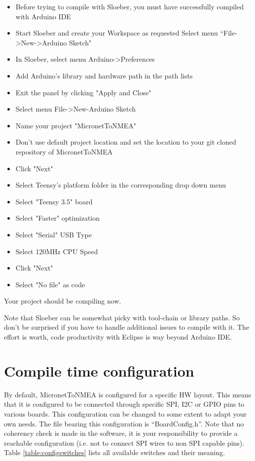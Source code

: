 \documentclass{report}
\begin{document}
\begin{itemize}
\item Before trying to compile with Sloeber, you must have successfully compiled with Arduino IDE
\item Start Sloeber and create your Workspace as requested Select menu “File->New->Arduino Sketch"
\item In Sloeber, select menu Arduino->Preferences
\item Add Arduino's library and hardware path in the path lists
\item Exit the panel by clicking "Apply and Close"
\item Select menu File->New-Arduino Sketch
\item Name your project "MicronetToNMEA"
\item Don't use default project location and set the location to your git cloned repository of MicronetToNMEA
\item Click "Next"
\item Select Teensy's platform folder
in the corresponding drop down menu
\item Select "Teensy 3.5" board
\item Select "Faster" optimization
\item Select "Serial" USB Type
\item Select 120MHz CPU Speed
\item Click "Next"
\item Select "No file" as code
\end{itemize}

Your project should be compiling now.

Note that Sloeber can be somewhat picky with tool-chain or library paths. So don’t be surprised if you have to handle additional issues to compile with it. The effort is worth, code productivity with Eclipse is way beyond Arduino IDE.

\section{Compile time configuration}

By default, MicronetToNMEA is configured for a specific HW layout. This means that it is configured to be connected through specific SPI, I2C or GPIO pins to various boards. This configuration can be changed to some extent to adapt your own needs. The file bearing this configuration is “BoardConfig.h”. Note that no coherency check is made in the software, it is your responsibility to provide a reachable configuration (i.e. not to connect SPI wires to non SPI capable pins). Table {\ref{table:configswitches}} lists all available switches and their meaning.
\end{document}
